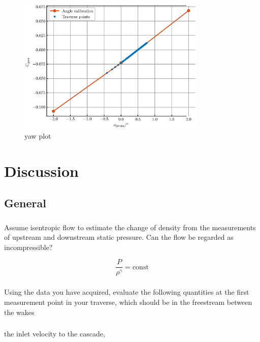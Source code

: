 \documentclass{article}
\begin{document}
\begin{figure}[H]
    \centering
    \includegraphics[width=0.8\textwidth]{figures/yaw_plot.eps}
    \caption{yaw plot}
    \label{fig:yaw_plot}
\end{figure}

\section{Discussion}

\subsection{General}

\subsubsection{}
Assume isentropic flow to estimate the change of density from the measurements of
upstream and downstream static pressure. Can the flow be regarded as incompressible?

\begin{equation}
    \frac{P}{\rho^\gamma} = \text{const}
\end{equation}

\subsubsection{}
Using the data you have acquired, evaluate the following quantities at the first
measurement point in your traverse, which should be in the freestream between the wakes

\subsubsection{}
the inlet velocity to the cascade,
\end{document}
